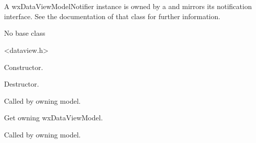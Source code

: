 \section{}\label{wxdataviewmodelnotifier}

A wxDataViewModelNotifier instance is owned by a
and mirrors its notification interface. See 
the documentation of that class for further
information.


No base class


<dataview.h>




\label{wxdataviewmodelnotifierwxdataviewmodelnotifier}


Constructor.

\label{wxdataviewmodelnotifierdtor}


Destructor.

\label{wxdataviewmodelnotifiercleared}


Called by owning model.

\label{wxdataviewmodelnotifiergetowner}


Get owning wxDataViewModel.

\label{wxdataviewmodelnotifieritemadded}


Called by owning model.

\label{wxdataviewmodelnotifieritemchanged}


